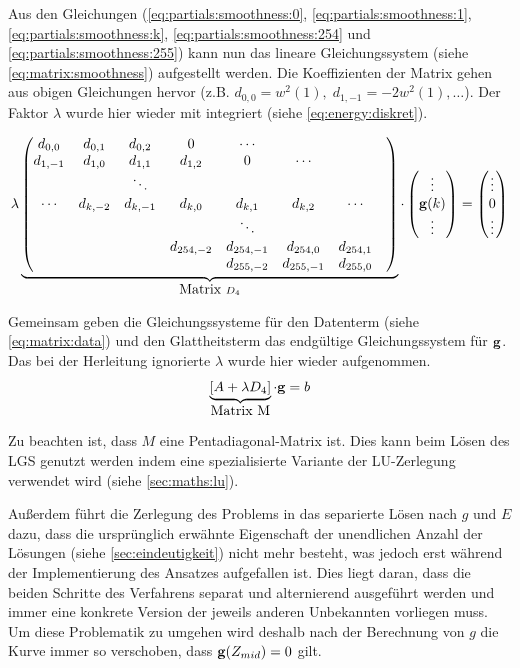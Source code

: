 Aus den Gleichungen (\ref{eq:partials:smoothness:0}, \ref{eq:partials:smoothness:1}, \ref{eq:partials:smoothness:k}, \ref{eq:partials:smoothness:254} und \ref{eq:partials:smoothness:255}) kann nun das lineare Gleichungssystem (siehe \autoref{eq:matrix:smoothness}) aufgestellt werden. Die  Koeffizienten der Matrix gehen aus obigen Gleichungen hervor (z.B. $d_{0,0} = w^2(1), \; d_{1,-1} = -2w^2(1), \dots$). Der Faktor $\lambda$ wurde hier wieder mit integriert (siehe \autoref{eq:energy:diskret}).

\begin{align}
\label{eq:matrix:smoothness}
\lambda
\underbrace{
\begin{pmatrix}
d_{0,0} & d_{0,1} & d_{0,2} & 0 &\cdots\\
d_{1,-1} & d_{1,0} & d_{1,1} & d_{1,2} & 0 &\cdots\\
&  & \ddots &  \\
\cdots  & d_{k,-2} & d_{k,-1} & d_{k,0}&d_{k,1} &d_{k,2} & \cdots\\
&&&&\ddots&&&\\
&&&d_{254,-2}&d_{254,-1}&d_{254,0}&d_{254,1}\\
&&&&d_{255,-2}&d_{255,-1}&d_{255,0}\\
\end{pmatrix}}_{\mbox{Matrix } D_4}
\cdot
\begin{pmatrix}
\vdots\\
\mathbf g(k)\\
\vdots
\end{pmatrix}
= 
\begin{pmatrix}
\vdots\\
0\\
\vdots
\end{pmatrix}
\end{align}


Gemeinsam geben die Gleichungssysteme für den Datenterm (siehe \autoref{eq:matrix:data}) und den Glattheitsterm das endgültige Gleichungssystem für $\mathbf g$. Das bei der Herleitung ignorierte $\lambda$ wurde hier wieder aufgenommen.
\begin{align}
\label{eq:g:lgs}
\underbrace{[A+\lambda D_4]}_{\mbox{Matrix M}}\cdot \mathbf g = b
\end{align}

Zu beachten ist, dass $M$ eine Pentadiagonal-Matrix ist. Dies kann beim Lösen des \gls{LGS} genutzt werden indem eine spezialisierte Variante der LU-Zerlegung verwendet wird (siehe \autoref{sec:maths:lu}).

Außerdem führt die Zerlegung des Problems in das separierte Lösen nach $g$ und $E$ dazu, dass die ursprünglich erwähnte Eigenschaft der unendlichen Anzahl der Lösungen (siehe \autoref{sec:eindeutigkeit}) nicht mehr besteht, was jedoch erst während der Implementierung des Ansatzes aufgefallen ist. Dies liegt daran, dass die beiden Schritte des Verfahrens separat und alternierend ausgeführt werden und immer eine konkrete Version der jeweils anderen Unbekannten vorliegen muss.
Um diese Problematik zu umgehen wird deshalb nach der Berechnung von $g$ die Kurve immer so verschoben, dass $\mathbf g(Z_{mid}) = 0$ gilt. 

